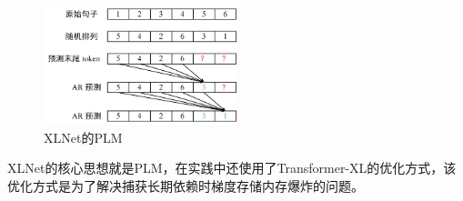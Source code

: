 \begin{figure}[htb]
    \centering
    \includegraphics[width=0.5\textwidth]{images/xlnet.png}
    \caption[xlnet]{XLNet的PLM}
    \label{fig:xlnet}
\end{figure}

XLNet的核心思想就是PLM，在实践中还使用了Transformer-XL的优化方式，该优化方式是为了解决捕获长期依赖时梯度存储内存爆炸的问题。
